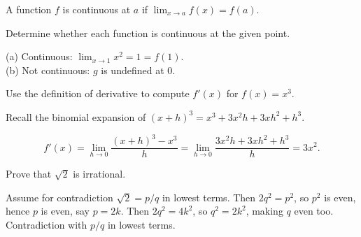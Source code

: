 \documentclass{pset}
\begin{document}
\maketitle

\begin{definition}[Continuity]
	A function $f$ is continuous at $a$ if
	$\lim_{x \to a} f(x) = f(a)$.
\end{definition}

\begin{problem}[10]
	Determine whether each function is continuous at the given point.
\end{problem}

\begin{solution}[3in]
	(a) Continuous: $\lim_{x \to 1} x^2 = 1 = f(1)$.\\
	(b) Not continuous: $g$ is undefined at $0$.
\end{solution}

\begin{problem}[15]
	Use the definition of derivative to compute $f'(x)$ for $f(x) = x^3$.
\end{problem}

\begin{hint}
	Recall the binomial expansion of $(x+h)^3 = x^3 + 3x^2 h + 3xh^2 + h^3$.
\end{hint}

\begin{solution}[4in]
	\[
		f'(x)
		= \lim_{h \to 0} \frac{(x+h)^3 - x^3}{h}
		= \lim_{h \to 0} \frac{3x^2 h + 3xh^2 + h^3}{h}
		= 3x^2.
	\]
\end{solution}

\begin{problem}[20]
	Prove that $\sqrt{2}$ is irrational.
\end{problem}

\begin{solution}[5in]
	Assume for contradiction $\sqrt{2} = p/q$ in lowest terms.
	Then $2q^2 = p^2$, so $p^2$ is even, hence $p$ is even, say $p = 2k$.
	Then $2q^2 = 4k^2$, so $q^2 = 2k^2$, making $q$ even too.
	Contradiction with $p/q$ in lowest terms.
\end{solution}
\end{document}
